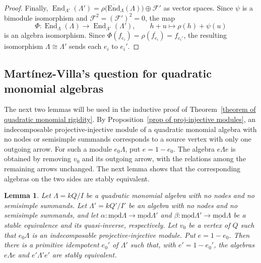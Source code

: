 \documentclass[11pt]{article}
\newcommand{\End}{\operatorname{End}}
\newcommand{\smod}{\operatorname{\underline{mod}}}
\newcommand{\isEnd}{\operatorname{\overline{End}}}
\newcommand{\ra}{\rightarrow}
\renewcommand{\cal}[1]{\mathcal #1}   %
\providecommand{\varLambda}{\Lambda}
\newtheorem{lemma}[theorem]{Lemma}
\theoremstyle{definition}
\begin{document}
\begin{proof}
			Finally, $\End_{\varLambda'}(\varLambda')=\rho\bigl(\isEnd_{\varLambda}(\varLambda)\bigr)\oplus\cal{F}'$ as vector spaces.
			Since $\psi$ is a bimodule isomorphism and $\cal{F}^2=(\cal{F}')^2=0$, the map
			\[
				\varPhi\colon\End_{\varLambda}(\varLambda)\longrightarrow\End_{\varLambda'}(\varLambda'),\qquad h+u\longmapsto\rho(h)+\psi(u)
			\]
			is an algebra isomorphism.
			Since $\varPhi(f_{e_i})=\rho(\overline{f_{e_i}})=f_{e_i'}$, the resulting isomorphism $\varLambda\cong\varLambda'$ sends each $e_i$ to $e_i'$.
		\end{proof}

	\subsection{Martínez-Villa's question for quadratic monomial algebras}\label{subsection of Martinez-Villa question}
		The next two lemmas will be used in the inductive proof of Theorem~\ref{theorem of quadratic monomial rigidity}.
		By Proposition~\ref{prop of proj-injective modules}, an indecomposable projective-injective module of a quadratic monomial algebra with no nodes or semisimple summands corresponds to a source vertex with only one outgoing arrow.
		For such a module $e_0\varLambda$, put $e=1-e_0$.
		The algebra $e\varLambda e$ is obtained by removing $v_0$ and its outgoing arrow, with the relations among the remaining arrows unchanged.
		The next lemma shows that the corresponding algebras on the two sides are stably equivalent.

		\begin{lemma}\label{lemma of stable equivalence for idempotent subalgebras}
			Let $\varLambda=kQ/I$ be a quadratic monomial algebra with no nodes and no semisimple summands.
			Let $\varLambda'=kQ'/I'$ be an algebra with no nodes and no semisimple summands, and let $\alpha\colon \smod \varLambda\ra\smod\varLambda'$ and $\beta\colon \smod \varLambda'\ra \smod\varLambda$ be a stable equivalence and its quasi-inverse, respectively.
			Let $v_0$ be a vertex of $Q$ such that $e_0\varLambda$ is an indecomposable projective-injective module.
			Put $e=1-e_0$.
			Then there is a primitive idempotent $e_0'$ of $\varLambda'$ such that, with $e'=1-e_0'$, the algebras $e\varLambda e$ and $e'\varLambda'e'$ are stably equivalent.
		\end{lemma}
\end{document}
